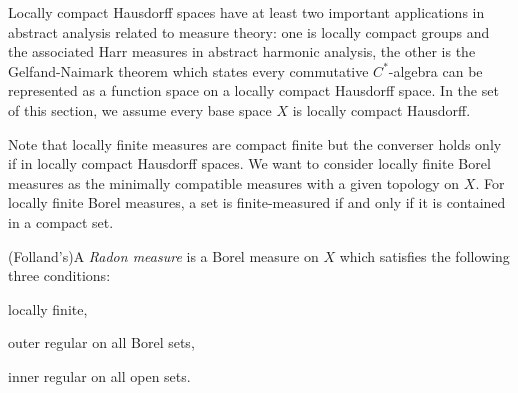 \documentclass{../crs}
\begin{document}
Locally compact Hausdorff spaces have at least two important applications in abstract analysis related to measure theory: one is locally compact groups and the associated Harr measures in abstract harmonic analysis, the other is the Gelfand-Naimark theorem which states every commutative $C^*$-algebra can be represented as a function space on a locally compact Hausdorff space.
In the set of this section, we assume every base space $X$ is locally compact Hausdorff.

Note that locally finite measures are compact finite but the converser holds only if in locally compact Hausdorff spaces.
We want to consider locally finite Borel measures as the minimally compatible measures with a given topology on $X$.
For locally finite Borel measures, a set is finite-measured if and only if it is contained in a compact set.
\begin{defn}
(Folland's)A \emph{Radon measure} is a Borel measure on $X$ which satisfies the following three conditions:
\begin{cond}
\item locally finite,
\item outer regular on all Borel sets,
\item inner regular on all open sets.
\end{cond}
\end{defn}
\end{document}
